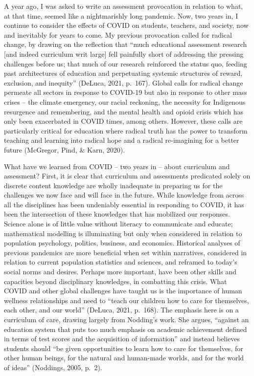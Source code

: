 \documentclass[
]{book}
\begin{document}
A year ago, I was asked to write an assessment provocation in relation to what, at that time, seemed like a nightmarishly long pandemic. Now, two years in, I continue to consider the effects of COVID on students, teachers, and society, now and inevitably for years to come. My previous provocation called for radical change, by drawing on the reflection that ``much educational assessment research {[}and indeed curriculum writ large{]} fell painfully short of addressing the pressing challenges before us; that much of our research reinforced the status quo, feeding past architectures of education and perpetuating systemic structures of reward, exclusion, and inequity'' (DeLuca, 2021, p.~167). Global calls for radical change permeate all sectors in response to COVID-19 but also in response to other mass crises -- the climate emergency, our racial reckoning, the necessity for Indigenous resurgence and remembering, and the mental health and opioid crisis which has only been exacerbated in COVID times, among others. However, these calls are particularly critical for education where radical truth has the power to transform teaching and learning into radical hope and a radical re-imagining for a better future (McGregor, Pind, \& Karn, 2020).

What have we learned from COVID -- two years in -- about curriculum and assessment? First, it is clear that curriculum and assessments predicated solely on discrete content knowledge are wholly inadequate in preparing us for the challenges we now face and will face in the future. While knowledge from across all the disciplines has been undeniably essential in responding to COVID, it has been the intersection of these knowledges that has mobilized our responses. Science alone is of little value without literacy to communicate and educate; mathematical modelling is illuminating but only when considered in relation to population psychology, politics, business, and economics. Historical analyses of previous pandemics are more beneficial when set within narratives, considered in relation to current population statistics and sciences, and reframed to today's social norms and desires. Perhaps more important, have been other skills and capacities beyond disciplinary knowledges, in combatting this crisis. What COVID and other global challenges have taught us is the importance of human wellness relationships and need to ``teach our children how to care for themselves, each other, and our world'' (DeLuca, 2021, p.~168). The emphasis here is on a curriculum of care, drawing largely from Nodding's work. She argues, ``against an education system that puts too much emphasis on academic achievement defined in terms of test scores and the acquisition of information'' and instead believes students should ``be given opportunities to learn how to care for themselves, for other human beings, for the natural and human-made worlds, and for the world of ideas'' (Noddings, 2005, p.~2).
\end{document}
